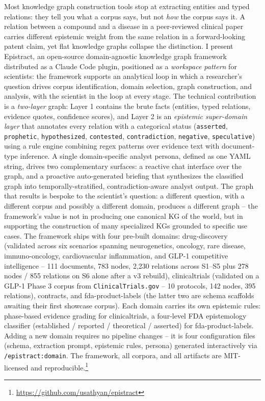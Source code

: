 Most knowledge graph construction tools stop at extracting entities and typed relations: they tell you what a corpus says, but not \emph{how} the corpus says it. A relation between a compound and a disease in a peer-reviewed clinical paper carries different epistemic weight from the same relation in a forward-looking patent claim, yet flat knowledge graphs collapse the distinction. I present Epistract, an open-source domain-agnostic knowledge graph framework distributed as a Claude Code plugin, positioned as a \emph{workspace pattern} for scientists: the framework supports an analytical loop in which a researcher's question drives corpus identification, domain selection, graph construction, and analysis, with the scientist in the loop at every stage. The technical contribution is a \emph{two-layer} graph: Layer 1 contains the brute facts (entities, typed relations, evidence quotes, confidence scores), and Layer 2 is an \emph{epistemic super-domain layer} that annotates every relation with a categorical status (\texttt{asserted}, \texttt{prophetic}, \texttt{hypothesized}, \texttt{contested}, \texttt{contradiction}, \texttt{negative}, \texttt{speculative}) using a rule engine combining regex patterns over evidence text with document-type inference. A single domain-specific analyst persona, defined as one YAML string, drives two complementary surfaces: a reactive chat interface over the graph, and a proactive auto-generated briefing that synthesizes the classified graph into temporally-stratified, contradiction-aware analyst output. The graph that results is bespoke to the scientist's question: a different question, with a different corpus and possibly a different domain, produces a different graph -- the framework's value is not in producing one canonical KG of the world, but in supporting the construction of many specialized KGs grounded to specific use cases. The framework ships with four pre-built domains: drug-discovery (validated across six scenarios spanning neurogenetics, oncology, rare disease, immuno-oncology, cardiovascular inflammation, and GLP-1 competitive intelligence -- 111 documents, 783 nodes, 2{,}230 relations across S1--S5 plus 278 nodes / 855 relations on S6 alone after a v3 rebuild), clinicaltrials (validated on a GLP-1 Phase 3 corpus from \texttt{ClinicalTrials.gov} -- 10 protocols, 142 nodes, 395 relations), contracts, and fda-product-labels (the latter two are schema scaffolds awaiting their first showcase corpus). Each domain carries its own epistemic rules: phase-based evidence grading for clinicaltrials, a four-level FDA epistemology classifier (established / reported / theoretical / asserted) for fda-product-labels. Adding a new domain requires no pipeline changes -- it is four configuration files (schema, extraction prompt, epistemic rules, persona) generated interactively via \texttt{/epistract:domain}. The framework, all corpora, and all artifacts are MIT-licensed and reproducible.\footnote{\url{https://github.com/usathyan/epistract}}
